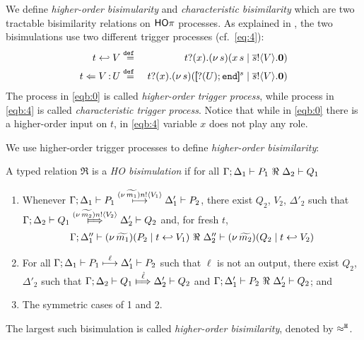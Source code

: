 We define \emph{higher-order bisimularity} and 
\emph{characteristic bisimilarity} which are
two tractable bisimilarity relations on $\mathsf{HO}\pi$ processes.
As explained in ,
the two bisimulations 
use two different trigger processes (cf.~\eqref{eq:4}):
%
\begin{eqnarray}
	t \hookleftarrow V	& \stackrel{\mathtt{def}\ }{=} &	t ? (x) . (\nu\, s)(x\, {s} \;|\; \overline{s} ! \langle V \rangle . \mathbf{0})						\label{eqb:0} \\
	t \Leftarrow V{\,:\,}U	& \stackrel{\mathtt{def}\ }{=} &	t ? (x) . (\nu\, s)([\!\![? (U) ; \mathtt{end}]\!\!]^{s} \;|\; \overline{s} ! \langle V \rangle . \mathbf{0})	\label{eqb:4}
\end{eqnarray}
%
The process in \eqref{eqb:0} is called \emph{higher-order trigger process},
while process in \eqref{eqb:4} is called \emph{characteristic trigger process}.
Notice that while 
in \eqref{eqb:0} there is a higher-order input on $t$, 
in \eqref{eqb:4} variable $x$ does not play any role.

We use higher-order trigger processes to define \emph{higher-order bisimilarity}:

\begin{definition}
	\label{d:hwb}
	A typed relation $\Re$ is a {\em  HO bisimulation} if 
	for all $\horel{\Gamma}{\Delta_1}{P_1}{\ \Re \ }{\Delta_2}{Q_1}$ 
%
	\begin{enumerate}[1)]
		\item 
				Whenever 
				$\Gamma; \Delta_1 \vdash P_1 \stackrel{(\nu\, \widetilde{m_1}) n ! \langle V_1 \rangle}{\longmapsto} \Delta_1' \vdash P_2$, there exist 
				$Q_2$, $V_2$, $\Delta'_2$ such that 
				$\horel{\Gamma}{\Delta_2}{Q_1}{\Hby{\news{\widetilde{m_2}} \bactout{n}{V_2}}}{\Delta_2'}{Q_2}$ and, for fresh $t$, 
				\[
					\begin{array}{lrlll}
						\Gamma; \Delta''_1  \proves  {\newsp{\widetilde{m_1}}{P_2 \Par \htrigger{t}{V_1}}}
						\ \Re\ 
						\Delta''_2 \proves {\newsp{\widetilde{m_2}}{Q_2 \Par \htrigger{t}{V_2}}}
					\end{array}
				\]
		\item	
				For all $\Gamma; \Delta_1 \vdash P_1 \stackrel{\ell}{\longmapsto} \Delta_1' \vdash P_2$ such that 
				$\ell$ is not an output, 
				there exist $Q_2$, $\Delta'_2$ such that 
				$\horel{\Gamma}{\Delta_2}{Q_1}{\Hby{\hat{\ell}}}{\Delta_2'}{Q_2}$
				and
				$\horel{\Gamma}{\Delta_1'}{P_2}{\ \Re \ }{\Delta_2'}{Q_2}$; and 

		\item	The symmetric cases of 1 and 2.                
	\end{enumerate}
%
	The largest such bisimulation is called \emph{higher-order bisimilarity}, denoted by $\approx^\mathtt{H}$.
\end{definition}



